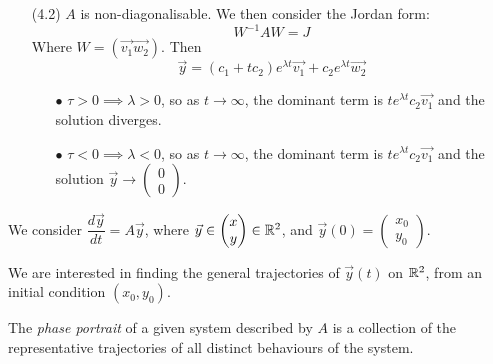 \documentclass[10pt]{scrartcl}
\renewcommand{\l}{\lambda}
\begin{document}
\begin{enumerate}
\item[\textsc{(4.2)}] $A$ is non-diagonalisable. We then consider the Jordan form:
\[
  W^{-1}AW = J
\]
Where $W = (\vec{v_1} \vec{w_2})$. Then 
\[
  \vec{y} = (c_1 + tc_2) e^{\l t}\vec{v_1} + c_2e^{\l t}\vec{w_2}
\]


\begin{enumerate}
  \item[$\bullet$] $\tau > 0 \implies \l > 0$, so as $t \to \infty$, the dominant term is $te^{\l t}c_2\vec{v_1}$ and the solution diverges. 
  \item[$\bullet$] $\tau < 0 \implies \l < 0$, so as $t \to \infty$, the dominant term is $te^{\l t}c_2\vec{v_1}$ and the solution $\vec{y} \to \begin{pmatrix}
  0 \\ 0
\end{pmatrix}$.
 

\end{enumerate}

	
\end{enumerate}






We consider $\dfrac{d\vec{y}}{dt} = A\vec{y}$, where $\vec{y} \in \begin{pmatrix}
  x \\ y 
\end{pmatrix}
\in \mathbb{R}^2$, and $\vec{y}(0) = 
\begin{pmatrix}
  x_0 \\ y_0 
\end{pmatrix}$. 

\begin{center}
\end{center}


We are interested in finding the general trajectories of $\vec{y}(t)$ on $\mathbb{R}^2$, from an initial condition $(x_0,y_0)$.\\

\begin{definition}
The \emph{phase portrait} of a given system described by $A$ is a collection of the representative trajectories of all distinct behaviours of the system.
\end{definition}\vsp
\end{document}
